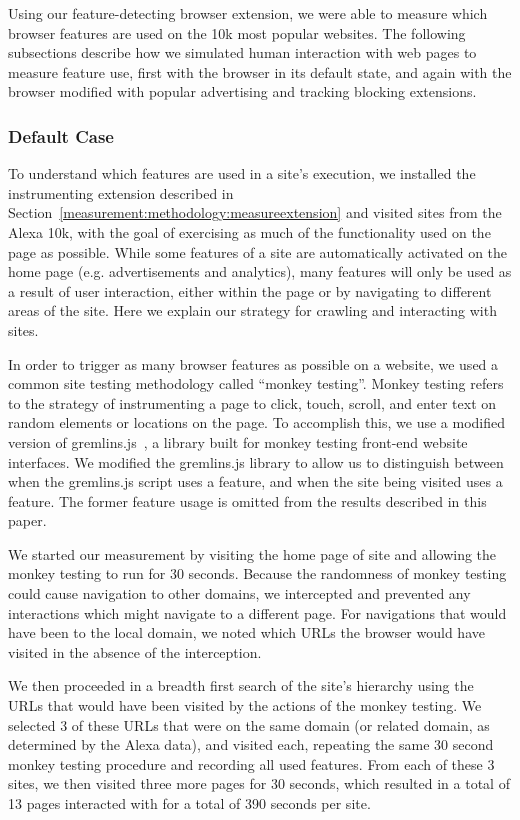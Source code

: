 Using our feature-detecting browser extension, we were able to measure which
browser features are used on the 10k most popular websites.  The following
subsections describe how we simulated human interaction
with web pages to measure feature use, first with the browser in its default
state, and again with the browser modified with popular advertising and tracking
blocking extensions.


\subsubsection{Default Case}
\label{measurement:methodology:default-case-measurements}

To understand which features are used in a site's execution, we installed the
instrumenting extension described in Section~\ref{measurement:methodology:measureextension}
and visited sites from the Alexa 10k, with the goal of
exercising as much of the functionality used on the page as possible.
While some \JS features of a site are automatically activated on the home page
(e.g. advertisements and analytics), many features will only be used as a result
of user interaction, either within the page or by navigating to different areas
of the site. Here we explain our strategy for crawling and interacting with sites.

In order to trigger as many browser features as possible on a website, we
used a common site testing methodology called ``monkey testing''.  Monkey
testing refers to the strategy of instrumenting a page to click, touch, scroll,
and enter text on random elements or locations on the page.  To accomplish this, we use a
modified version of gremlins.js~\cite{zaninotto2016gremlins}, a library built
for monkey testing front-end website interfaces.  We modified the gremlins.js
library to allow us to distinguish between when the gremlins.js script uses a
feature, and when the site being visited uses a feature.  The former feature usage is omitted from the
results described in this paper.

We started our measurement by visiting the home page of site and allowing
the monkey testing to run for 30 seconds.  Because the randomness of monkey
testing could cause navigation to other domains, we intercepted and prevented
any interactions which might navigate to a different page.  For
navigations that would have been to the local domain, we noted which URLs the
browser would have visited in the absence of the interception.

We then proceeded in a breadth first search of the site's hierarchy using the
URLs that would have been visited by the actions of the monkey
testing.  We selected 3 of these URLs that were on the same domain (or
related domain, as determined by the Alexa data), and visited each, repeating
the same 30 second monkey testing procedure and recording all used features.
From each of these 3 sites, we then visited three more pages for 30 seconds,
which resulted in a total of 13 pages interacted with for a total of 390 seconds
per site.

